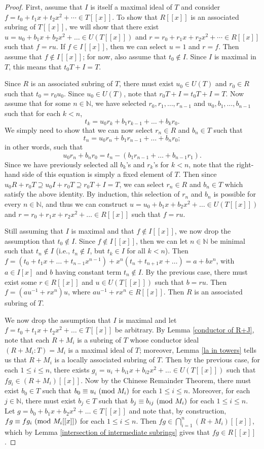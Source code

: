 \documentclass[12pt]{amsart}
\theoremstyle{definition}
\newcommand{\bN}{\mathbb N}
\newcommand{\modulo}[1]{\textup{ (mod }#1)}
\begin{document}
\begin{proof}
    First, assume that $I$ is itself a maximal ideal of $T$ and consider $f=t_0+t_1x+t_2x^2+\cdots\in T[[x]]$. To show that $R[[x]]$ is an associated subring of $T[[x]]$, we will show that there exist $u=u_0+b_1x+b_2x^2+\dots\in U(T[[x]])$ and $r=r_0+r_1x+r_2x^2+\cdots \in R[[x]]$ such that $f=ru$. If $f\in I[[x]]$, then we can select $u=1$ and $r=f$. Then assume that $f\notin I[[x]]$; for now, also assume that $t_0\notin I$. Since $I$ is maximal in $T$, this means that $t_0T+I=T$.

    Since $R$ is an associated subring of $T$, there must exist $u_0\in U(T)$ and $r_0\in R$ such that $t_0=r_0u_0$. Since $u_0\in U(T)$, note that $r_0T+I=t_0T+I=T$. Now assume that for some $n\in\bN$, we have selected $r_0,r_1,\dots,r_{n-1}$ and $u_0,b_1,\dots,b_{n-1}$ such that for each $k<n$, $$t_k=u_0r_k+b_1r_{k-1}+\dots+b_kr_0.$$
    We simply need to show that we can now select $r_n\in R$ and $b_n\in T$ such that $$t_n=u_0r_n+b_1r_{n-1}+\dots+b_nr_0;$$
    in other words, such that
    $$u_0r_n+b_nr_0=t_n-(b_1r_{n-1}+\dots+b_{n-1}r_1).$$
    Since we have previously selected all $b_k$'s and $r_k$'s for $k<n$, note that the right-hand side of this equation is simply a fixed element of $T$. Then since $u_0R+r_0T\supseteq u_0I+r_0T\supseteq r_0T+I=T$, we can select $r_n\in R$ and $b_n\in T$ which satisfy the above identity. By induction, this selection of $r_n$ and $b_n$ is possible for every $n\in\bN$, and thus we can construct $u=u_0+b_1x+b_2x^2+\dots\in U(T[[x]])$ and $r=r_0+r_1x+r_2x^2+\dots\in R[[x]]$ such that $f=ru$.

    Still assuming that $I$ is maximal and that $f\notin I[[x]]$, we now drop the assumption that $t_0\notin I$. Since $f\notin I[[x]]$, then we can let $n\in\bN$ be minimal such that $t_n\notin I$ (i.e., $t_n\notin I$, but $t_k\in I$ for all $k<n$). Then $f=(t_0+t_1x+\dots+t_{n-1}x^{n-1})+x^n(t_n+t_{n+1}x+\dots)=a+bx^n$, with $a\in I[x]$ and $b$ having constant term $t_n\notin I$. By the previous case, there must exist some $r\in R[[x]]$ and $u\in U(T[[x]])$ such that $b=ru$. Then $f=(au^{-1}+rx^n)u$, where $au^{-1}+rx^n\in R[[x]]$. Then $R$ is an associated subring of $T$.

    We now drop the assumption that $I$ is maximal and let $f=t_0+t_1x+t_2x^2+\dots\in T[[x]]$ be arbitrary. By Lemma \ref{conductor of R+J}, note that each $R+M_i$ is a subring of $T$ whose conductor ideal $(R+M_i:T)=M_i$ is a maximal ideal of $T$; moreover, Lemma \ref{la in towers} tells us that $R+M_i$ is a locally associated subring of $T$. Then by the previous case, for each $1\leq i\leq n$, there exists $g_i=u_i+b_{i1}x+b_{i2}x^2+\dots \in U(T[[x]])$ such that $fg_i\in (R+M_i)[[x]]$. Now by the Chinese Remainder Theorem, there must exist $b_0\in T$ such that $b_0\equiv u_i\modulo{M_i}$ for each $1\leq i\leq n$. Moreover, for each $j\in \bN$, there must exist $b_j\in T$ such that $b_j\equiv b_{ij}\modulo{M_i}$ for each $1\leq i\leq n$. Let $g=b_0+b_1x+b_2x^2+\dots \in T[[x]]$ and note that, by construction, $fg\equiv fg_i\modulo{M_i[[x]]}$ for each $1\leq i\leq n$. Then $fg\in \bigcap_{i=1}^n(R+M_i)[[x]]$, which by Lemma \ref{intersection of intermediate subrings} gives that $fg\in R[[x]]$.


\end{proof}
\end{document}
